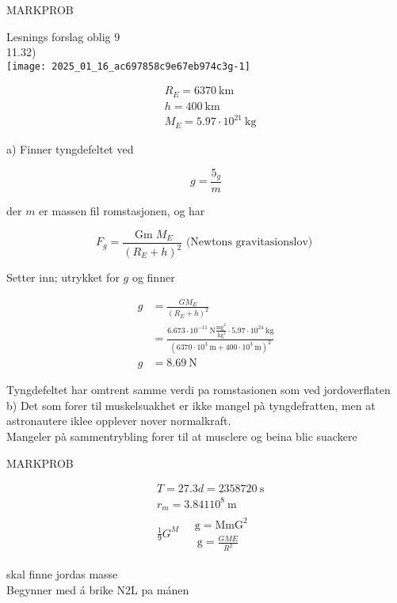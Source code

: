 \documentclass[10pt]{article}
\begin{document}
MARKPROB

Lesnings forslag oblig 9\\
11.32)\\
\texttt{[image: 2025\_01\_16\_ac697858c9e67eb974c3g-1]}

$$
\begin{aligned}
& R_{E}=6370 \mathrm{~km} \\
& h=400 \mathrm{~km} \\
& M_{E}=5.97 \cdot 10^{21} \mathrm{~kg}
\end{aligned}
$$

a) Finner tyngdefeltet ved

$$
g=\frac{5_{g}}{m}
$$

der $m$ er massen fil romstasjonen, og har

$$
F_{g}=\frac{\operatorname{Gm} M_{E}}{\left(R_{E}+h\right)^{2}} \text { (Newtons gravitasionslov) }
$$

Setter inn; utrykket for $g$ og finner

$$
\begin{aligned}
g & =\frac{G M_{E}}{\left(R_{E}+h\right)^{2}} \\
& =\frac{6.673 \cdot 10^{-11} \mathrm{~N} \frac{\mathrm{mg}^{2}}{\mathrm{~kg}^{2}} \cdot 5.97 \cdot 10^{24} \mathrm{~kg}}{\left(6370 \cdot 10^{3} \mathrm{~m}+400 \cdot 10^{3} \mathrm{~m}\right)^{2}} \\
g & =8.69 \mathrm{~N}
\end{aligned}
$$

Tyngdefeltet har omtrent samme verdi pa romstasionen som ved jordoverflaten\\
b) Det som forer til muskelsuakhet er ikke mangel pà tyngdefratten, men at astronautere iklee opplever nover normalkraft.\\
Mangeler pà sammentrybling forer til at musclere og beina blic suackere

MARKPROB

$$
\begin{aligned}
& T=27.3 d=2358720 \mathrm{~s} \\
& r_{m}=3.84110^{8} \mathrm{~m} \\
& \frac{1}{9} G^{M} \quad \begin{array}{l}
\mathrm{g}=\mathrm{MmG}^{2} \\
\mathrm{~g}=\frac{G M E}{R^{2}}
\end{array}
\end{aligned}
$$

skal finne jordas masse\\
Begynner med á brike N2L pa mánen
\end{document}
